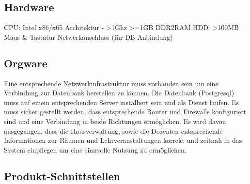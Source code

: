 \subsection{Hardware}
CPU: Intel x86/x65 Architektur - >1Ghz
>=1GB DDR2RAM
HDD: >100MB
Maus \& Tastatur
Netwerkanschluss (für DB Anbindung)

\subsection{Orgware}
Eine entsprechende Netzwerkinfrastruktur muss vorhanden sein um eine Verbindung zur Datenbank herstellen zu können.
Die Datenbank (Postgresql) muss auf einem entsprechenden Server installiert sein und als Dienst laufen. Es muss sicher gestellt werden, dass entsprechende Router und Firewalls konfiguriert sind und eine Verbindung in beide Richtungen ermöglichen.
Es wird davon ausgegangen, dass die Hausverwaltung, sowie die Dozenten entsprechende Informationen zur Räumen und Lehrveranstaltungen korrekt und zeitnah in das System einpflegen um eine sinnvolle Nutzung zu ermöglichen.

\subsection{Produkt-Schnittstellen}
